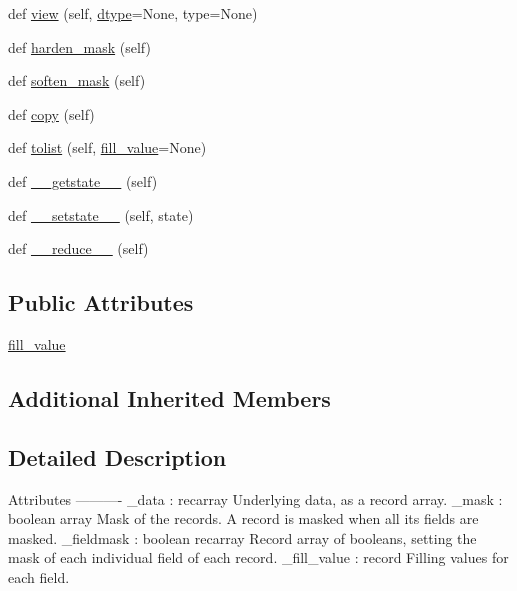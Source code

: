 \begin{DoxyCompactItemize}
\item 
def \hyperlink{classnumpy_1_1ma_1_1mrecords_1_1MaskedRecords_ad5efe5e740d35464afb9ad5ed33a6f51}{view} (self, \hyperlink{classnumpy_1_1ma_1_1core_1_1MaskedArray_acaf5e9f1356ae9652fc4eddef5878b18}{dtype}=None, type=None)
\item 
def \hyperlink{classnumpy_1_1ma_1_1mrecords_1_1MaskedRecords_a28249ecfefad53871e76511fcefe4d29}{harden\+\_\+mask} (self)
\item 
def \hyperlink{classnumpy_1_1ma_1_1mrecords_1_1MaskedRecords_ae067fd67053be3338bf4fbfca398c7ea}{soften\+\_\+mask} (self)
\item 
def \hyperlink{classnumpy_1_1ma_1_1mrecords_1_1MaskedRecords_af8828d46015f1ab2db803151727beeb9}{copy} (self)
\item 
def \hyperlink{classnumpy_1_1ma_1_1mrecords_1_1MaskedRecords_aa2e69f8be6671386e2968ed9ce2fa188}{tolist} (self, \hyperlink{classnumpy_1_1ma_1_1mrecords_1_1MaskedRecords_af679e8a301f29d0593d47399cce90bc9}{fill\+\_\+value}=None)
\item 
def \hyperlink{classnumpy_1_1ma_1_1mrecords_1_1MaskedRecords_a1a094d25a7064d10ac2842c8e9567dcf}{\+\_\+\+\_\+getstate\+\_\+\+\_\+} (self)
\item 
def \hyperlink{classnumpy_1_1ma_1_1mrecords_1_1MaskedRecords_aa79cec54b45cd5c345bbcf1294a3f5c1}{\+\_\+\+\_\+setstate\+\_\+\+\_\+} (self, state)
\item 
def \hyperlink{classnumpy_1_1ma_1_1mrecords_1_1MaskedRecords_ae0fbe5896b079790b30f716d77c0d34a}{\+\_\+\+\_\+reduce\+\_\+\+\_\+} (self)
\end{DoxyCompactItemize}
\subsection*{Public Attributes}
\begin{DoxyCompactItemize}
\item 
\hyperlink{classnumpy_1_1ma_1_1mrecords_1_1MaskedRecords_af679e8a301f29d0593d47399cce90bc9}{fill\+\_\+value}
\end{DoxyCompactItemize}
\subsection*{Additional Inherited Members}


\subsection{Detailed Description}
\begin{DoxyVerb}Attributes
----------
_data : recarray
    Underlying data, as a record array.
_mask : boolean array
    Mask of the records. A record is masked when all its fields are
    masked.
_fieldmask : boolean recarray
    Record array of booleans, setting the mask of each individual field
    of each record.
_fill_value : record
    Filling values for each field.\end{DoxyVerb}
 

